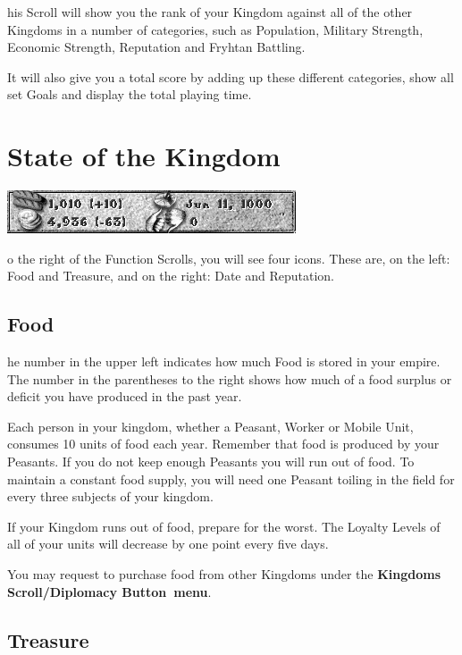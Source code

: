 his Scroll will show you the rank of your Kingdom against all of the other Kingdoms in a number of categories, such as Population, Military Strength, Economic Strength, Reputation and Fryhtan Battling.

It will also give you a total score by adding up these different categories, show all set Goals and display the total playing time.

\section{State of the Kingdom}


\begin{center}
	\includegraphics[width=0.7\linewidth]{Ifoodgoldetc}
\end{center}

o the right of the Function Scrolls, you will see four icons. These are, on the left: Food and Treasure, and on the right: Date and Reputation.

\subsection{Food}


he number in the upper left indicates how much Food is stored in your empire. The number in the parentheses to the right shows how much of a food surplus or deficit you have produced in the past year.

Each person in your kingdom, whether a Peasant, Worker or Mobile Unit, consumes 10 units of food each year. Remember that food is produced by your Peasants. If you do not keep enough Peasants you will run out of food. To maintain a constant food supply, you will need one Peasant toiling in the field for every three subjects of your kingdom.

If your Kingdom runs out of food, prepare for the worst. The Loyalty Levels of all of your units will decrease by one point every five days.

You may request to purchase food from other Kingdoms under the \textbf{Kingdoms Scroll/Diplomacy Button menu}.

\subsection{Treasure}

